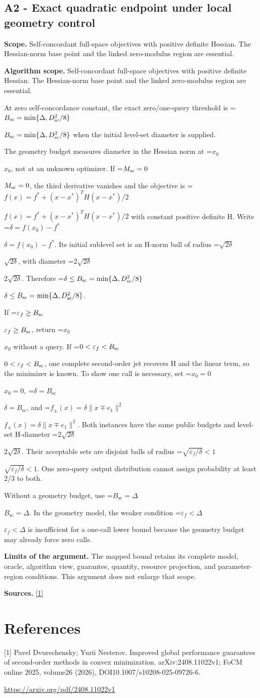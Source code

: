 \documentclass[10pt,a4paper]{article}
\newcommand{\AtlasMath}[1]{\par\begingroup\centering\setbox0=\hbox{$\displaystyle #1$}\ifdim\wd0>1.4\linewidth\typeout{ATLAS WIDE FORMULA: \the\wd0}\fi\ifdim\wd0>\linewidth\resizebox{\linewidth}{!}{\box0}\else\box0\fi\par\endgroup}
\newcommand{\AtlasInlineMath}[1]{\begingroup\setbox0=\hbox{$#1$}\ifdim\wd0>.4\linewidth\endgroup\AtlasMath{#1}\else\endgroup$#1$\fi}
\begin{document}
\subsection{A2 - Exact quadratic endpoint under local geometry control}
\textbf{Scope.} Self-concordant full-space objectives with positive definite Hessian. The Hessian-norm base point and the linked zero-modulus region are essential.

\textbf{Algorithm scope.} Self-concordant full-space objectives with positive definite Hessian. The Hessian-norm base point and the linked zero-modulus region are essential.

At zero self-concordance constant, the exact zero/one-query threshold is \AtlasInlineMath{B_{\rm sc}=\min\{\Delta,D_{\rm sc}^2/8\}} when the initial level-set diameter is supplied.

The geometry budget measures diameter in the Hessian norm at \AtlasInlineMath{x_0}, not at an unknown optimizer. If \AtlasInlineMath{M_{\rm sc}=0}, the third derivative vanishes and the objective is \AtlasInlineMath{f(x)=f^*+(x-x^*)^TH(x-x^*)/2} with constant positive definite H. Write \AtlasInlineMath{\delta=f(x_0)-f^*}. Its initial sublevel set is an H-norm ball of radius \AtlasInlineMath{\sqrt{2\delta}}, with diameter \AtlasInlineMath{2\sqrt{2\delta}}. Therefore \AtlasInlineMath{\delta\le B_{\rm sc}=\min\{\Delta,D_{\rm sc}^2/8\}}.

If \AtlasInlineMath{\varepsilon_f\ge B_{\rm sc}}, return \AtlasInlineMath{x_0} without a query. If \AtlasInlineMath{0<\varepsilon_f<B_{\rm sc}}, one complete second-order jet recovers H and the linear term, so the minimizer is known. To show one call is necessary, set \AtlasInlineMath{x_0=0}, \AtlasInlineMath{\delta=B_{\mathrm{sc}}}, and \AtlasInlineMath{f_\pm(x)=\delta\|x\mp e_1\|^2}. Both instances have the same public budgets and level-set H-diameter \AtlasInlineMath{2\sqrt{2\delta}}. Their acceptable sets are disjoint balls of radius \AtlasInlineMath{\sqrt{\varepsilon_f/\delta}<1}. One zero-query output distribution cannot assign probability at least 2/3 to both.

Without a geometry budget, use \AtlasInlineMath{B_{\mathrm{sc}}=\Delta}. In the geometry model, the weaker condition \AtlasInlineMath{\varepsilon_f<\Delta} is insufficient for a one-call lower bound because the geometry budget may already force zero calls.

\textbf{Limits of the argument.} The mapped bound retains its complete model, oracle, algorithm view, guarantee, quantity, resource projection, and parameter-region conditions. This argument does not enlarge that scope.

\textbf{Sources.} \href{https://arxiv.org/pdf/2408.11022v1}{[1]}

\section{References}
[1] Pavel Dvurechensky; Yurii Nesterov. Improved global performance guarantees of second-order methods in convex minimization. arXiv:2408.11022v1; FoCM online 2025, volume26 (2026), DOI10.1007/s10208-025-09726-6.

\url{https://arxiv.org/pdf/2408.11022v1}
\end{document}
